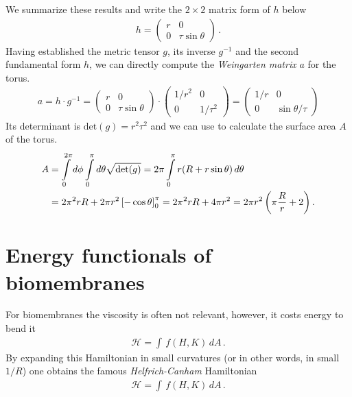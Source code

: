 \documentclass[11pt, DINA4, fleqn]{amsart}
\begin{document}
We summarize these results and write the $2\times 2$ matrix form of $h$ below
\begin{align}
h = \begin{pmatrix}
r & 0 \\
0 & \tau\sin\theta
\end{pmatrix} \, .
\end{align}
Having established the metric tensor $g$, its inverse $g^{-1}$ and the second fundamental form $h$, we can directly compute the \emph{Weingarten matrix} $a$ for the torus.
\begin{align}
a = h \cdot g^{-1} =
\begin{pmatrix}
r & 0 \\0 & \tau \sin \theta
\end{pmatrix}
\cdot
\begin{pmatrix}
1/r^2 & 0 \\0 & 1/\tau^2
\end{pmatrix} = 
\begin{pmatrix}
1/r & 0 \\
0 & \sin\theta / \tau
\end{pmatrix}
\end{align}
Its determinant is $\text{det}(g) = r^2\tau^2$ and we can use to calculate the surface area $A$ of the torus.
\begin{align}
A &= \int \displaylimits_{0}^{2\pi} d\phi \int \displaylimits_{0}^{\pi} d\theta \sqrt{\text{det}(g)} =
2\pi \int \displaylimits_{0}^{\pi}  r (R + r\sin\theta) \, d\theta \\
&= 2\pi^2 rR + 2\pi r^2 \left[-\cos\theta\right]_{0}^{\pi} = 2\pi^2rR + 4\pi r^2
= 2\pi r^2\left(\pi\dfrac{R}{r} + 2\right).
\end{align}

\section{Energy functionals of biomembranes}
For biomembranes the viscosity is often not relevant, however, it costs energy to bend it
\begin{align}
\mathcal{H} = \int \, f(H,K) \, dA \, .
\end{align}
By expanding this Hamiltonian in small curvatures (or in other words, in small $1/R$) one obtains the famous \emph{Helfrich-Canham} Hamiltonian
\begin{align}
\mathcal{H} = \int \, f(H,K) \, dA \, .
\end{align}
\end{document}
